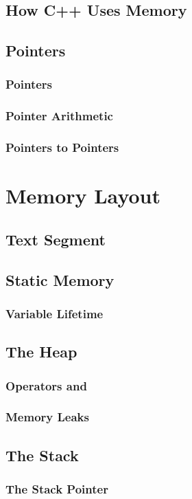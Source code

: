 \documentclass{article}
\begin{document}
\subsection{How C++ Uses Memory}

\subsection{Pointers}

\subsubsection{ Pointers}

\subsubsection{Pointer Arithmetic}

\subsubsection{Pointers to Pointers}

\section{Memory Layout}

\subsection{Text Segment}

\subsection{Static Memory}

\subsubsection{Variable Lifetime}

\subsection{The Heap}

\subsubsection{Operators  and }

\subsubsection{Memory Leaks}

\subsection{The Stack}

\subsubsection{The Stack Pointer}
\end{document}
